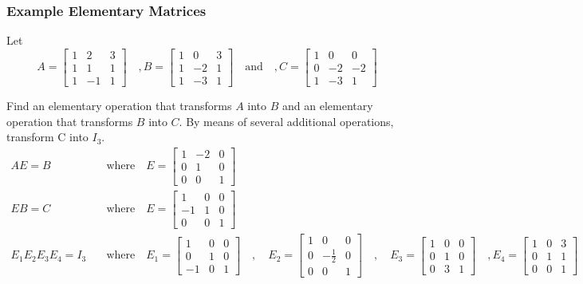 \documentclass[10pt, oneside]{article}
\begin{document}
\subsubsection{Example Elementary Matrices}
Let
\[
	A = \begin{bmatrix} 1 & 2 & 3 \\ 1 & 1 & 1 \\ 1 & -1 & 1 \end{bmatrix} \quad ,
	B = \begin{bmatrix} 1 & 0 & 3 \\ 1 & -2 & 1 \\ 1 & -3 & 1 \end{bmatrix} \quad \text{and} \quad ,
	C = \begin{bmatrix} 1 & 0 & 0 \\ 0 & -2 & -2 \\ 1 & -3 & 1 \end{bmatrix}
\]

Find an elementary operation that transforms $A$ into $B$ and an elementary operation that transforms $B$ into $C$. By means of several additional operations, transform C into $I_3$.
\[
	\begin{split}
		AE = B \quad & \text{where} \quad E = \begin{bmatrix} 1 & -2 & 0 \\ 0 & 1 & 0 \\ 0 & 0 & 1 \end{bmatrix} \\
		EB = C \quad & \text{where} \quad E = \begin{bmatrix} 1 & 0 & 0 \\ -1 & 1 & 0 \\ 0 & 0 & 1 \end{bmatrix} \\
		E_1E_2E_3E_4 = I_3 \quad & \text{where} \quad E_1 = \begin{bmatrix} 1 & 0 & 0 \\ 0 & 1 & 0 \\ -1 & 0 & 1 \end{bmatrix} \quad ,
		\quad E_2 = \begin{bmatrix} 1 & 0 & 0 \\ 0 & -\frac{1}{2} & 0 \\ 0 & 0 & 1 \end{bmatrix} \quad ,
		\quad E_3 = \begin{bmatrix} 1 & 0 & 0 \\ 0 & 1 & 0 \\ 0 & 3 & 1 \end{bmatrix} \quad , E_4 = \begin{bmatrix} 1 & 0 & 3 \\ 0 & 1 & 1 \\ 0 & 0 & 1 \end{bmatrix}
	\end{split}
\]
\end{document}
